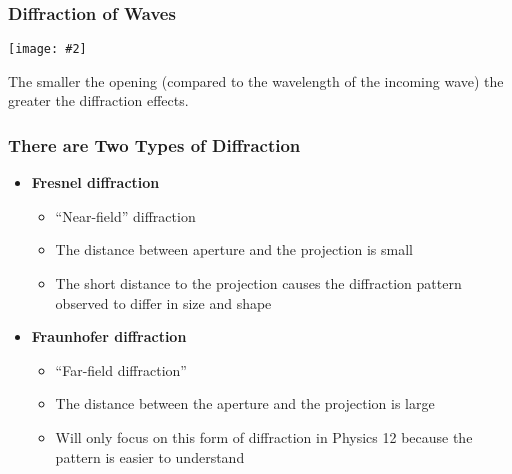 \documentclass[compress,aspectratio=169]{beamer}
\newcommand{\pic}[2]{\texttt{[image: \#2]}}
\begin{document}
\begin{frame}
  \frametitle{Diffraction of Waves}
  \begin{center}
    \pic{.6}{diffraction1.jpg}
  \end{center}
  The smaller the opening (compared to the wavelength of the incoming wave)
  the greater the diffraction effects.
\end{frame}

\begin{frame}
  \frametitle{There are Two Types of Diffraction}
  \begin{itemize}
  \item\textbf{Fresnel diffraction}
    \begin{itemize}
    \item ``Near-field'' diffraction
    \item The distance between aperture and the projection is small
    \item The short distance to the projection causes the diffraction pattern
      observed to differ in size and shape
    \end{itemize}
  \item\textbf{Fraunhofer diffraction}
    \begin{itemize}
    \item ``Far-field diffraction''
    \item The distance between the aperture and the projection is large
    \item Will only focus on this form of diffraction in Physics 12 because
      the pattern is easier to understand
    \end{itemize}
  \end{itemize}
\end{frame}
\end{document}
